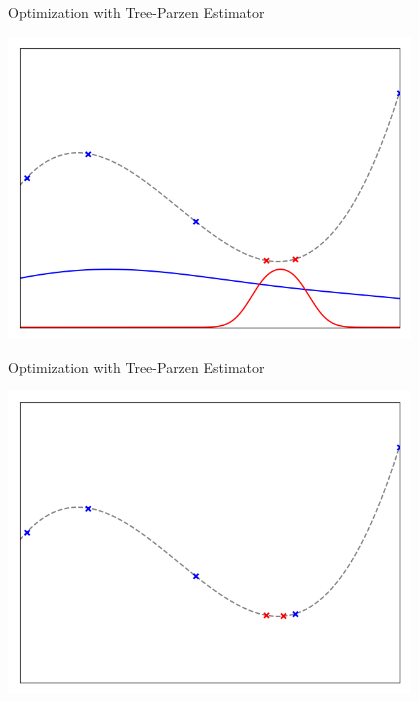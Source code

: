 \begin{frame}[c,fragile]{Optimization with Tree-Parzen Estimator }

\centering
\includegraphics[width=0.8\textwidth]{images/tpeiter_2_pdfs.png}


\end{frame}
\begin{frame}[c,fragile]{Optimization with Tree-Parzen Estimator }

\centering
\includegraphics[width=0.8\textwidth]{images/tpeiter_3_observations.png}


\end{frame}

